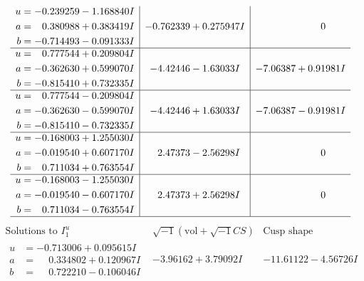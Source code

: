 \documentclass[1p]{elsarticle_modified}
\theoremstyle{definition}
\newcommand{\I}{\sqrt{-1}}
\begin{document}
$$\begin{array}{c|c|c}
\begin{aligned}
u &= -0.239259 - 1.168840 I \\
a &= \phantom{-}0.380988 + 0.383419 I \\
b &= -0.714493 - 0.091333 I\end{aligned}
 & -0.762339 + 0.275947 I & \phantom{-0.000000 } 0 \\ \hline\begin{aligned}
u &= \phantom{-}0.777544 + 0.209804 I \\
a &= -0.362630 + 0.599070 I \\
b &= -0.815410 + 0.732335 I\end{aligned}
 & -4.42446 - 1.63033 I & -7.06387 + 0.91981 I \\ \hline\begin{aligned}
u &= \phantom{-}0.777544 - 0.209804 I \\
a &= -0.362630 - 0.599070 I \\
b &= -0.815410 - 0.732335 I\end{aligned}
 & -4.42446 + 1.63033 I & -7.06387 - 0.91981 I \\ \hline\begin{aligned}
u &= -0.168003 + 1.255030 I \\
a &= -0.019540 + 0.607170 I \\
b &= \phantom{-}0.711034 + 0.763554 I\end{aligned}
 & \phantom{-}2.47373 - 2.56298 I & \phantom{-0.000000 } 0 \\ \hline\begin{aligned}
u &= -0.168003 - 1.255030 I \\
a &= -0.019540 - 0.607170 I \\
b &= \phantom{-}0.711034 - 0.763554 I\end{aligned}
 & \phantom{-}2.47373 + 2.56298 I & \phantom{-0.000000 } 0\\
 \hline 
 \end{array}$$\newpage$$\begin{array}{c|c|c}  
\text{Solutions to }I^u_{1}& \I (\text{vol} + \sqrt{-1}CS) & \text{Cusp shape}\\
 \hline 
\begin{aligned}
u &= -0.713006 + 0.095615 I \\
a &= \phantom{-}0.334802 + 0.120967 I \\
b &= \phantom{-}0.722210 - 0.106046 I\end{aligned}
 & -3.96162 + 3.79092 I & -11.61122 - 4.56726 I \\ \hline\begin{aligned}

\end{aligned}
\end{array}$$
\end{document}
